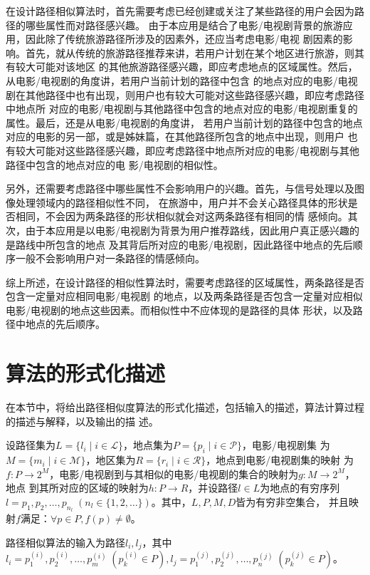 在设计路径相似算法时，首先需要考虑已经创建或关注了某些路径的用户会因为路径的哪些属性而对路径感兴趣。
由于本应用是结合了电影/电视剧背景的旅游应用，因此除了传统旅游路径所涉及的因素外，还应当考虑电影/电视
剧因素的影响。首先，就从传统的旅游路径推荐来讲，若用户计划在某个地区进行旅游，则其有较大可能对该地区
的其他旅游路径感兴趣，即应考虑地点的区域属性。然后，从电影/电视剧的角度讲，若用户当前计划的路径中包含
的地点对应的电影/电视剧在其他路径中也有出现，则用户也有较大可能对这些路径感兴趣，即应考虑路径中地点所
对应的电影/电视剧与其他路径中包含的地点对应的电影/电视剧重复的属性。最后，还是从电影/电视剧的角度讲，
若用户当前计划的路径中包含的地点对应的电影的另一部，或是姊妹篇，在其他路径所包含的地点中出现，则用户
也有较大可能对这些路径感兴趣，即应考虑路径中地点所对应的电影/电视剧与其他路径中包含的地点对应的电
影/电视剧的相似性。

另外，还需要考虑路径中哪些属性不会影响用户的兴趣。首先，与信号处理以及图像处理领域内的路径相似性不同，
在旅游中，用户并不会关心路径具体的形状是否相同，不会因为两条路径的形状相似就会对这两条路径有相同的情
感倾向。其次，由于本应用是以电影/电视剧为背景为用户推荐路线，因此用户真正感兴趣的是路线中所包含的地点
及其背后所对应的电影/电视剧，因此路径中地点的先后顺序一般不会影响用户对一条路径的情感倾向。

综上所述，在设计路径的相似性算法时，需要考虑路径的区域属性，两条路径是否包含一定量对应相同电影/电视剧
的地点，以及两条路径是否包含一定量对应相似电影/电视剧的地点这些因素。而相似性中不应体现的是路径的具体
形状，以及路径中地点的先后顺序。

\section{算法的形式化描述}
在本节中，将给出路径相似度算法的形式化描述，包括输入的描述，算法计算过程的描述与解释，以及输出的描
述。

设路径集为$L=\{l_i\mid i\in\mathscr{L}\}$，地点集为$P=\{p_i\mid i\in\mathscr{P}\}$，电影/电视剧集
为$M=\{m_i\mid i\in\mathscr{M}\}$，地区集为$R=\{r_i\mid i\in\mathscr{R}\}$，地点到电影/电视剧集的映射
为$f:P\rightarrow 2^{M}$，电影/电视剧到与其相似的电影/电视剧的集合的映射为$g:M\rightarrow 2^M$，地点
到其所对应的区域的映射为$h:P\rightarrow
R$，并设路径$l\in
L$为地点的有穷序列$l=p_1,p_2,\dots,p_{n_l}\;(n_l\in\{1,2,\dots\})$。其中，$L,P,M,D$皆为有穷非空集合，
并且映射$f$满足：$\forall p\in P,f(p)\neq\emptyset$。

路径相似算法的输入为路径$l_i,l_j$，其中$l_i=p^{(i)}_1,p^{(i)}_2,\dots,p^{(i)}_m\;(p^{(i)}_k\in P),
l_j=p^{(j)}_1,p^{(j)}_2,\dots,p^{(j)}_n\;(p^{(j)}_k\in P)$。

